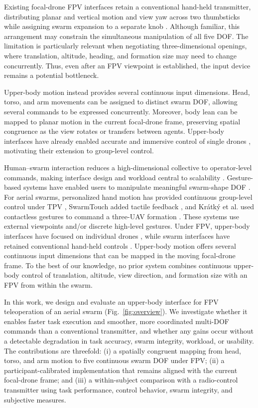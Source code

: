 \documentclass[conference, a4paper]{IEEEtran}
\begin{document}
Existing focal-drone FPV interfaces retain a conventional hand-held
transmitter, distributing planar and vertical motion and view yaw across two
thumbsticks while assigning swarm expansion to a separate knob
\cite{ben_focaldrone}. Although familiar, this arrangement may constrain the
simultaneous manipulation of all five DOF. The limitation is particularly
relevant when negotiating three-dimensional openings, where translation,
altitude, heading, and formation size may need to change concurrently. Thus,
even after an FPV viewpoint is established, the input device remains a
potential bottleneck.

Upper-body motion instead provides several continuous input dimensions. Head,
torso, and arm movements can be assigned to distinct swarm DOF, allowing
several commands to be expressed concurrently. Moreover, body lean can be
mapped to planar motion in the current focal-drone frame, preserving spatial
congruence as the view rotates or transfers between agents. Upper-body
interfaces have already enabled accurate and immersive control of
single drones \cite{rognon2018flyjacket,miehlbradt2018datadriven}, motivating
their extension to group-level control.

Human--swarm interaction reduces a high-dimensional collective to
operator-level commands, making interface design and workload central to
scalability \cite{kolling2016survey,hocraffer2017meta}. Gesture-based systems
have enabled users to manipulate meaningful swarm-shape DOF
\cite{alonsomora2015gesture,suresh2019gesture}. For aerial swarms,
personalized hand motion has provided continuous group-level control under TPV
\cite{macchini2021personalized}, SwarmTouch added tactile feedback
\cite{tsykunov2019swarmtouch}, and Krátký et al. used contactless gestures to
command a three-UAV formation \cite{kratky2025gesture}. These systems use
external viewpoints and/or discrete high-level gestures. Under FPV,
upper-body interfaces have focused on individual drones
\cite{rognon2018flyjacket,miehlbradt2018datadriven,macchini2024datadriven},
while swarm interfaces have retained conventional hand-held controls
\cite{ben_focaldrone}. Upper-body motion offers several continuous input
dimensions that can be mapped in the moving focal-drone frame. To the best of
our knowledge, no prior system combines continuous upper-body control of
translation, altitude, view direction, and formation size with an FPV from
within the swarm.

In this work, we design and evaluate an upper-body interface for FPV
teleoperation of an aerial swarm (Fig.~\ref{fig:overview}). We investigate
whether it enables faster task execution and smoother, more coordinated
multi-DOF commands than a conventional transmitter, and whether any gains occur
without a detectable degradation in task accuracy, swarm integrity, workload,
or usability. The contributions are threefold: (i) a spatially congruent
mapping from head, torso, and arm motion to five continuous swarm DOF under FPV;
(ii) a participant-calibrated implementation that remains aligned with the
current focal-drone frame; and (iii) a within-subject comparison with a
radio-control transmitter using task performance, control behavior, swarm
integrity, and subjective measures.
\end{document}
